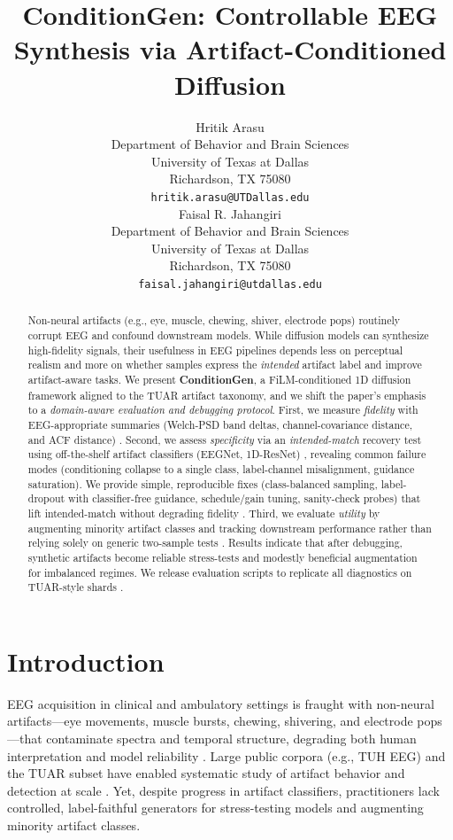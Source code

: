 \documentclass{article}
\title{ConditionGen: Controllable EEG Synthesis via Artifact-Conditioned Diffusion}
\author{
  Hritik Arasu \\
  Department of Behavior and Brain Sciences\\
  University of Texas at Dallas\\
  Richardson, TX 75080 \\
  \texttt{hritik.arasu@UTDallas.edu} \\
  \And
  Faisal R. Jahangiri \\
  Department of Behavior and Brain Sciences\\
  University of Texas at Dallas\\
  Richardson, TX 75080 \\
  \texttt{faisal.jahangiri@utdallas.edu} \\
}
\begin{document}
\maketitle



\begin{abstract}
Non-neural artifacts (e.g., eye, muscle, chewing, shiver, electrode pops) routinely corrupt EEG and confound downstream models. While diffusion models can synthesize high-fidelity signals, their usefulness in EEG pipelines depends less on perceptual realism and more on whether samples express the \emph{intended} artifact label and improve artifact-aware tasks. We present \textbf{ConditionGen}, a FiLM-conditioned 1D diffusion framework aligned to the TUAR artifact taxonomy, and we shift the paper’s emphasis to a \emph{domain-aware evaluation and debugging protocol}. First, we measure \emph{fidelity} with EEG-appropriate summaries (Welch-PSD band deltas, channel-covariance distance, and ACF distance) \citep{welch1967psd}. Second, we assess \emph{specificity} via an \emph{intended-match} recovery test using off-the-shelf artifact classifiers (EEGNet, 1D-ResNet) \citep{lawhern2018eegnet,he2016resnet}, revealing common failure modes (conditioning collapse to a single class, label-channel misalignment, guidance saturation). We provide simple, reproducible fixes (class-balanced sampling, label-dropout with classifier-free guidance, schedule/gain tuning, sanity-check probes) that lift intended-match without degrading fidelity \citep{ho2020ddpm,ho2022cfg}. Third, we evaluate \emph{utility} by augmenting minority artifact classes and tracking downstream performance rather than relying solely on generic two-sample tests \citep{gretton2012mmd,sajjadi2018prd}. Results indicate that after debugging, synthetic artifacts become reliable stress-tests and modestly beneficial augmentation for imbalanced regimes. We release evaluation scripts to replicate all diagnostics on TUAR-style shards \citep{obeid2016tueg,hamid2020tuar}.
\end{abstract}



\section{Introduction}
EEG acquisition in clinical and ambulatory settings is fraught with non-neural artifacts—eye movements, muscle bursts, chewing, shivering, and electrode pops—that contaminate spectra and temporal structure, degrading both human interpretation and model reliability \citep{uriguengarciazapirain2015}. Large public corpora (e.g., TUH EEG) and the TUAR subset have enabled systematic study of artifact behavior and detection at scale \citep{obeid2016tueg,hamid2020tuar}. Yet, despite progress in artifact classifiers, practitioners lack controlled, label-faithful generators for stress-testing models and augmenting minority artifact classes.
\end{document}
